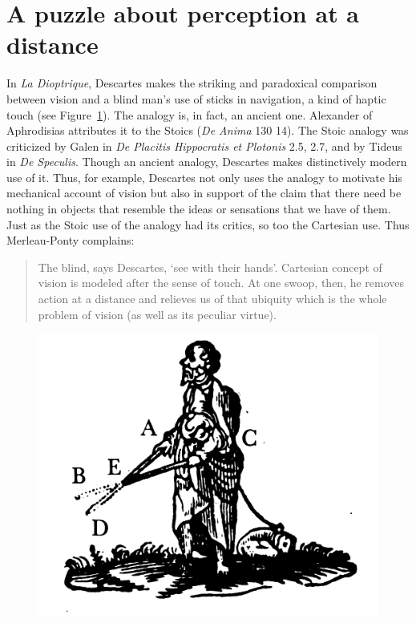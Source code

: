 \documentclass[12pt]{article}
\begin{document}

\section{A puzzle about perception at a distance} %
\label{sec:a_puzzle_about_perception_at_a_distance}

In \emph{La Dioptrique}, Descartes makes the striking and paradoxical comparison between vision and a blind man's use of sticks in navigation, a kind of haptic touch (see Figure~\ref{fig:blind}). The analogy is, in fact, an ancient one. Alexander of Aphrodisias attributes it to the Stoics (\emph{De Anima} 130 14). The Stoic analogy was criticized by Galen in \emph{De Placitis Hippocratis et Plotonis} 2.5, 2.7, and by Tideus in \emph{De Speculis}. Though an ancient analogy, Descartes makes distinctively modern use of it. Thus, for example, Descartes not only uses the analogy to motivate his mechanical account of vision but also in support of the claim that there need be nothing in objects that resemble the ideas or sensations that we have of them. Just as the Stoic use of the analogy had its critics, so too the Cartesian use. Thus Merleau-Ponty complains:
\begin{quote}
	The blind, says Descartes, `see with their hands'. Cartesian concept of vision is modeled after the sense of touch. At one swoop, then, he removes action at a distance and relieves us of that ubiquity which is the whole problem of vision (as well as its peculiar virtue). \citep[170]{Merleau-Ponty:1964aa}
\end{quote}

\begin{figure}[htbp]
	\centering
		\includegraphics[scale=2]{graphics/blind.jpeg}
	\caption{\citealt{Descartes:1637uq}}
	\label{fig:blind}
\end{figure}
\end{document}
